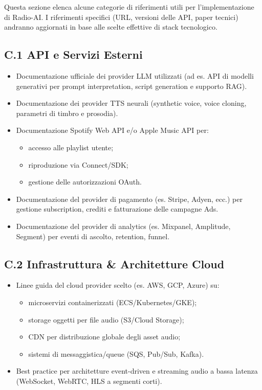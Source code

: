 \documentclass[11pt,a4paper]{article}
\begin{document}
Questa sezione elenca alcune categorie di riferimenti utili per l’implementazione di Radio-AI. I riferimenti specifici (URL, versioni delle API, paper tecnici) andranno aggiornati in base alle scelte effettive di stack tecnologico.

\subsection*{C.1 API e Servizi Esterni}

\begin{itemize}[leftmargin=*]
    \item Documentazione ufficiale dei provider LLM utilizzati (ad es. API di modelli generativi per prompt interpretation, script generation e supporto RAG).
    \item Documentazione dei provider TTS neurali (synthetic voice, voice cloning, parametri di timbro e prosodia).
    \item Documentazione Spotify Web API e/o Apple Music API per:
    \begin{itemize}
        \item accesso alle playlist utente;
        \item riproduzione via Connect/SDK;
        \item gestione delle autorizzazioni OAuth.
    \end{itemize}
    \item Documentazione del provider di pagamento (es. Stripe, Adyen, ecc.) per gestione subscription, crediti e fatturazione delle campagne Ads.
    \item Documentazione del provider di analytics (es. Mixpanel, Amplitude, Segment) per eventi di ascolto, retention, funnel.
\end{itemize}

\subsection*{C.2 Infrastruttura \& Architetture Cloud}

\begin{itemize}[leftmargin=*]
    \item Linee guida del cloud provider scelto (es. AWS, GCP, Azure) su:
    \begin{itemize}
        \item microservizi containerizzati (ECS/Kubernetes/GKE);
        \item storage oggetti per file audio (S3/Cloud Storage);
        \item CDN per distribuzione globale degli asset audio;
        \item sistemi di messaggistica/queue (SQS, Pub/Sub, Kafka).
    \end{itemize}
    \item Best practice per architetture event-driven e streaming audio a bassa latenza (WebSocket, WebRTC, HLS a segmenti corti).
\end{itemize}
\end{document}
